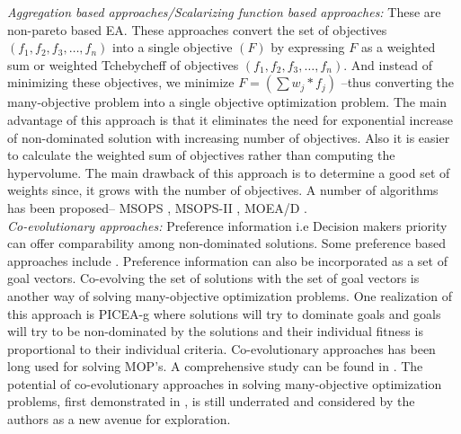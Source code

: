 \documentclass[journal]{IEEEtran}
\begin{document}
\textit{Aggregation based approaches/Scalarizing function based approaches:}
These are non-pareto based EA. These approaches convert the set of objectives $(f_1,f_2,f_3,\dots,f_n)$ into a single objective $(F)$ by expressing $F$ as a weighted sum or weighted Tchebycheff of objectives $(f_1,f_2,f_3,\dots,f_n)$. And instead of minimizing these objectives, we minimize $F=(\sum w_j*f_j)$ --thus converting the many-objective problem into a single objective optimization problem. The main advantage of this approach is that it eliminates the need for exponential increase of non-dominated solution with increasing number of objectives. Also it is easier to calculate the weighted sum of objectives rather than computing the hypervolume. The main drawback of this approach is to determine a good set of weights since, it grows with the number of objectives. A number of algorithms has been proposed-- MSOPS \cite{hughes2003multiple}, MSOPS-II \cite{hughes2007msops}, MOEA/D \cite{zhang2007moea}.\\

\textit{Co-evolutionary approaches:}
Preference information i.e Decision makers priority can offer comparability among non-dominated solutions. Some preference based approaches include \cite{fleming2005many}\cite{deb2006reference}\cite{thiele2007preference}. Preference information can also be incorporated as a set of goal vectors. Co-evolving the set of solutions with the set of goal vectors is another way of solving many-objective optimization problems. One realization of this approach is PICEA-g \cite{wang2013preference} where solutions will try to dominate goals and goals will try to be non-dominated by the solutions and their individual fitness is proportional to their individual criteria. Co-evolutionary approaches has been long used for solving MOP's. A comprehensive study can be found in \cite{kleeman2006coevolutionary}. The potential of co-evolutionary approaches in solving many-objective optimization problems, first demonstrated in \cite{purshouse2011preference}, is still underrated and considered by the authors as a new avenue for exploration.\\
\end{document}
